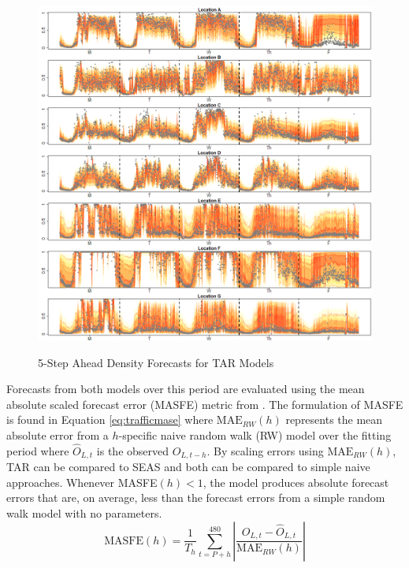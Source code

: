 \begin{figure}[htbp]
\caption{5-Step Ahead Density Forecasts for TAR Models}
\includegraphics[width=\textwidth]{DENS5Plots}
\label{fig:DENS5Plots}
\end{figure}


Forecasts from both models over this period are evaluated using the mean absolute scaled forecast error (MASFE) metric from \cite{Hyndman2006}. The formulation of MASFE is found in Equation \ref{eq:trafficmase} where $\textrm{MAE}_{RW}(h)$ represents the mean absolute error from a $h$-specific naive random walk (RW) model over the fitting period where $\widehat{O}_{L,t}$ is the observed $O_{L,t-h}$. By scaling errors using $\textrm{MAE}_{RW}(h)$, TAR can be compared to SEAS and both can be compared to simple naive approaches. Whenever MASFE$(h)<1$, the model produces absolute forecast errors that are, on average, less than the forecast errors from a simple random walk model with no parameters.
\begin{equation}
\label{eq:trafficmase}
  \textrm{MASFE}(h)=\frac{1}{T_h}\sum\limits_{t=P+h}^{480}\left|\frac{O_{L,t}-\widehat{O}_{L,t}}{\textrm{MAE}_{RW}(h)}\right|
\end{equation}

